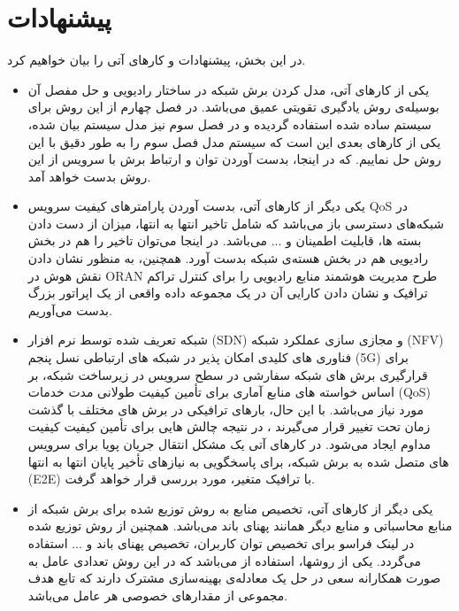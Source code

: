  \section{پیشنهادات}
 در این بخش، پیشنهادات و کارهای آتی را بیان خواهیم کرد.
 \begin{itemize}
\item
 یکی از کارهای آتی، مدل کردن برش شبکه در ساختار رادیویی و حل مفصل آن بوسیله‌ی روش یادگیری تقویتی عمیق می‌باشد. در فصل چهارم از این روش برای سیستم ساده شده استفاده گردیده و در فصل سوم نیز مدل سیستم بیان شده، یکی از کارهای بعدی این است که سیستم مدل فصل سوم را به طور دقیق 
با این روش حل نماییم. که در اینجا، بدست آوردن توان و ارتباط برش با سرویس از این روش بدست خواهد آمد.
\item 
یکی دیگر از کارهای آتی، بدست آوردن پارامترهای کیفیت سرویس QoS
در شبکه‌های دسترسی باز می‌باشد که شامل تاخیر انتها به انتها، میزان از دست دادن بسته ها،
قابلیت اطمینان و ... می‌باشد.
در اینجا می‌توان تاخیر را هم در بخش رادیویی هم در بخش هسته‌ی شبکه بدست آورد. 
همچنین،
به منظور نشان دادن نقش هوش در ORAN طرح مدیریت هوشمند منابع رادیویی را برای کنترل تراکم ترافیک و نشان دادن کارایی آن در یک مجموعه داده واقعی از یک اپراتور بزرگ بدست می‌آوریم.
\item 
شبکه تعریف شده توسط نرم افزار (SDN) و مجازی سازی عملکرد شبکه (NFV) فناوری های کلیدی امکان پذیر در شبکه های ارتباطی نسل پنجم (5G) برای قرارگیری برش های شبکه سفارشی در سطح سرویس در زیرساخت شبکه، بر اساس خواسته های منابع آماری برای تأمین کیفیت طولانی مدت خدمات (QoS) مورد نیاز می‌باشد. با این حال، بارهای ترافیکی در برش های مختلف با گذشت زمان تحت تغییر قرار می‌گیرند ، در نتیجه چالش هایی برای تأمین کیفیت کیفیت مداوم ایجاد می‌شود.
در کارهای آتی یک مشکل انتقال جریان پویا برای سرویس های متصل شده به برش شبکه، برای پاسخگویی به نیازهای تأخیر پایان انتها به انتها (E2E) با ترافیک متغیر، مورد بررسی قرار خواهد گرفت.
\item
یکی دیگر از کارهای آتی، تخصیص منابع به روش توزیع شده برای برش شبکه از منابع محاسباتی و منابع دیگر همانند پهنای باند می‌باشد.
همچنین از روش توزیع شده در لینک فراسو  
برای تخصیص توان کاربران، تخصیص پهنای باند و ... استفاده می‌گردد. یکی از روشها، استفاده از 
می‌باشد که در این روش تعدادی عامل به صورت همکارانه سعی در حل یک معادله‌ی بهینه‌سازی مشترک دارند که تابع هدف مجموعی از مقدارهای خصوصی هر عامل ‌می‌باشد. 
 \end{itemize}
 
  